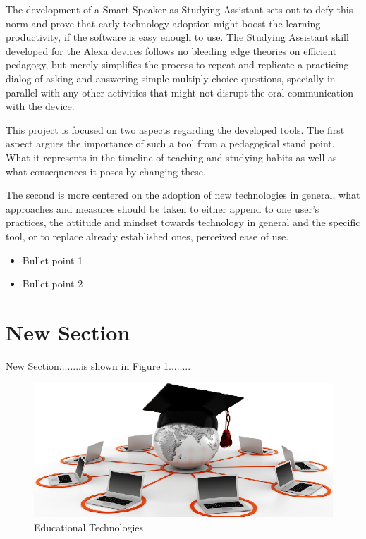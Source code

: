 The development of a Smart Speaker as Studying Assistant sets out to defy this norm and prove that early technology adoption might boost the learning productivity, if the software is easy enough to use. The Studying Assistant skill developed for the Alexa devices follows no bleeding edge theories on efficient pedagogy, but merely simplifies the process to repeat and replicate a practicing dialog of asking and answering simple multiply choice questions, specially in parallel with any other activities that might not disrupt the oral communication with the device.

This project is focused on two aspects regarding the developed tools. The first aspect argues the importance of such a tool from a pedagogical stand point. What it represents in the timeline of teaching and studying habits as well as what consequences it poses by changing these. 

The second is more centered on the adoption of new technologies in general, what approaches and measures should be taken to either append to one user's practices, the attitude and mindset towards technology in general and the specific tool, or to replace already established ones, perceived ease of use.



\begin{itemize}
	\item{Bullet point 1}
	\item {Bullet point 2}
\end{itemize}


\section{New Section}

New Section........is shown in Figure \ref{fig:eduTec}........

\begin{figure}[h]
	\centering
	\includegraphics[width=1\textwidth]{images/eduTec.png}
	\caption{Educational Technologies \cite{google}}
	\label{fig:eduTec} 
\end{figure}
\FloatBarrier

